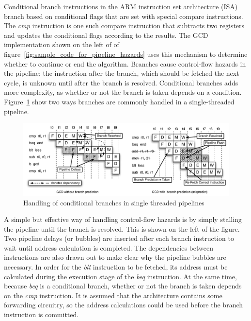 Conditional branch instructions in the ARM instruction set architecture (ISA) branch based on conditional flags that are set with special compare instructions.
The \emph{cmp} instruction is one such compare instruction that subtracts two registers and updates the conditional flags according to the results.
The GCD implementation shown on the left of of figure~\ref{fig:sample_code_for_pipeline_hazards} uses this mechanism to determine whether to continue or end the algorithm.
Branches cause control-flow hazards in the pipeline; the instruction after the branch, which should be fetched the next cycle, is unknown until after the branch is resolved.
Conditional branches adds more complexity, as whether or not the branch is taken depends on a condition. 
Figure~\ref{fig:branch_execution_non_interleaved_pipeline} show two ways branches are commonly handled in a single-threaded pipeline. 
\begin{figure}
\begin{center}
\includegraphics[scale=.58]{figs/branch_execution_non_interleaved_pipeline}
\end{center}
\vspace{-10pt}
\caption{Handling of conditional branches in single threaded pipelines}
\label{fig:branch_execution_non_interleaved_pipeline}
\end{figure}
A simple but effective way of handling control-flow hazards is by simply stalling the pipeline until the branch is resolved.
This is shown on the left of the figure. 
Two pipeline delays (or bubbles) are inserted after each branch instruction to wait until address calculation is completed.
The dependencies between instructions are also drawn out to make clear why the pipeline bubbles are necessary.
In order for the \emph{blt} instruction to be fetched, its address must be calculated during the execution stage of the \emph{beq} instruction.
At the same time, because \emph{beq} is a conditional branch, whether or not the branch is taken depends on the \emph{cmp} instruction.
It is assumed that the architecture contains some forwarding circuitry, so the address calculations could be used before the branch instruction is committed.        
